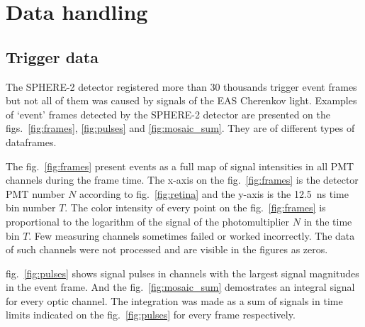 \documentclass[final,5p,times,twocolumn]{elsarticle}
\begin{document}
\section{Data handling}


\subsection{Trigger data}

The SPHERE-2 detector registered more than 30 thousands trigger event frames but not all of them was caused by signals of the EAS Cherenkov light. 
Examples of `event' frames detected by the SPHERE-2 detector are presented on the figs.~\ref{fig:frames}, \ref{fig:pulses} and \ref{fig:mosaic_sum}. They are of different types of  dataframes. 

The fig.~\ref{fig:frames} present events as a full map of signal intensities in all PMT channels during the frame time. The x-axis on the fig.~\ref{fig:frames} is the detector PMT number $N$ according to fig.~\ref{fig:retina} and the y-axis is the 12.5~ns time bin number $T$. The color intensity of every point on the fig.~\ref{fig:frames} is proportional to the logarithm of the signal of the  photomultiplier $N$ in the time bin $T$. Few measuring channels sometimes failed or worked incorrectly. The data of such channels were not processed and are visible in the figures as zeros.

fig.~\ref{fig:pulses} shows signal pulses in channels with the largest signal magnitudes in the event frame. And the fig.~\ref{fig:mosaic_sum} demostrates an integral signal for every optic channel. The integration was made as a sum of signals in time limits indicated on the fig.~\ref{fig:pulses} for every frame respectively. 


\end{document}

